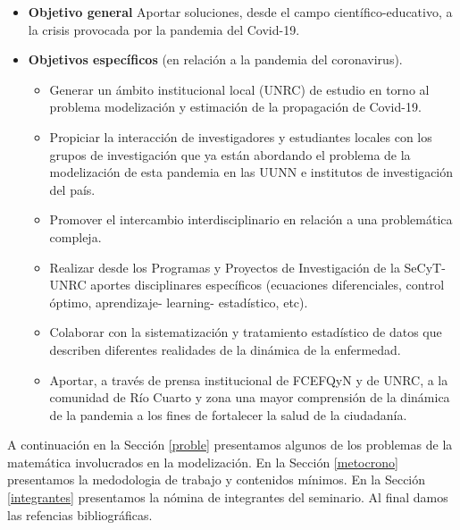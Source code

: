 \documentclass{article}
\begin{document}
\begin{itemize}
\item   {\bf Objetivo general} Aportar soluciones, desde el campo científico-educativo, a la crisis provocada por la pandemia del Covid-19.


\item {\bf Objetivos específicos}  (en relación a la pandemia del coronavirus).
\begin{itemize}
	\item Generar un ámbito institucional local (UNRC) de estudio en torno al problema modelización   y estimación de la propagación de Covid-19.
	
	\item Propiciar la interacción de investigadores y estudiantes locales con los grupos de investigación que ya están abordando el problema de la modelización de esta pandemia en las UUNN e institutos de investigación del país. 
	
	\item Promover el intercambio interdisciplinario en relación a una problemática compleja.
	
	\item Realizar desde los Programas y Proyectos de Investigación de la SeCyT-UNRC aportes disciplinares específicos (ecuaciones diferenciales, control óptimo, aprendizaje- learning- estadístico, etc). 
	
	\item Colaborar con la sistematización y tratamiento estadístico de datos que describen diferentes realidades de la dinámica de la enfermedad.  
	
	\item Aportar, a través de prensa institucional de FCEFQyN y de UNRC, a la comunidad de Río Cuarto y zona una mayor comprensión de la dinámica de la pandemia a los fines de fortalecer la salud de la ciudadanía.	
	
	
\end{itemize}

\end{itemize}



 A continuación en la Sección \ref{proble}  presentamos algunos de los problemas de la matemática  involucrados en la modelización.  En la Sección \ref{metocrono} presentamos la medodologia de trabajo y contenidos mínimos. En la Sección \ref{integrantes} presentamos la nómina de integrantes del seminario. Al final damos las refencias bibliográficas.

 
\end{document}
